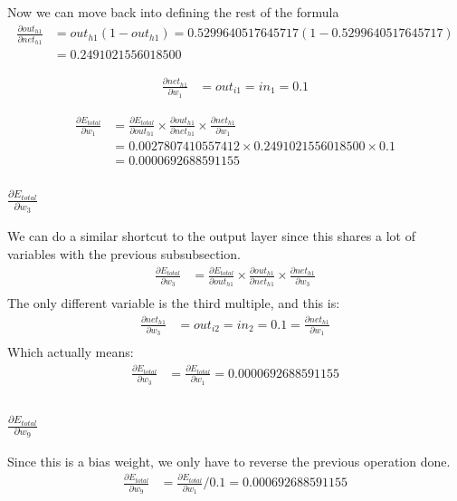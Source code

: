 \documentclass{article}
\begin{document}
Now we can move back into defining the rest of the formula
\begin{align*}
    \frac{\partial out_{h1}}{\partial net_{h1}} & =
    out_{h1}(1 - out_{h1}) = 0.5299640517645717(1-0.5299640517645717) \\
    & = 0.2491021556018500
\end{align*}

\begin{align*}
    \frac{\partial net_{h1}}{\partial w_1} & = 
    out_{i1} = in_{1} = 0.1
\end{align*}

\begin{align*}
    \frac{\partial E_{total}}{\partial w_1} & =
    \frac{\partial E_{total}}{\partial out_{h1}} \times
    \frac{\partial out_{h1}}{\partial net_{h1}} \times
    \frac{\partial net_{h1}}{\partial w_1} \\
    & = 0.0027807410557412 \times 0.2491021556018500 \times 0.1 \\
    & = 0.0000692688591155
\end{align*}

\subsubsection{$\frac{\partial E_{total}}{\partial w_3}$}
We can do a similar shortcut to the output layer since this shares a lot of
variables with the previous subsubsection.
\begin{align*} 
    \frac{\partial E_{total}}{\partial w_3} & =
    \frac{\partial E_{total}}{\partial out_{h1}} \times
    \frac{\partial out_{h1}}{\partial net_{h1}} \times
    \frac{\partial net_{h1}}{\partial w_3} \\
\end{align*}
The only different variable is the third multiple, and this is:
\begin{align*}
    \frac{\partial net_{h1}}{\partial w_3} & = 
    out_{i2} = in_{2} = 0.1 =
    \frac{\partial net_{h1}}{\partial w_1} \\
\end{align*}
Which actually means:
\begin{align*} 
    \frac{\partial E_{total}}{\partial w_3} & =
    \frac{\partial E_{total}}{\partial w_1} =
    0.0000692688591155 \\
\end{align*}

\subsubsection{$\frac{\partial E_{total}}{\partial w_9}$}
Since this is a bias weight, we only have to reverse the previous operation done.
\begin{align*} 
    \frac{\partial E_{total}}{\partial w_9} & =
    \frac{\partial E_{total}}{\partial w_1} / 0.1 =
    0.000692688591155 \\
\end{align*}
\end{document}

